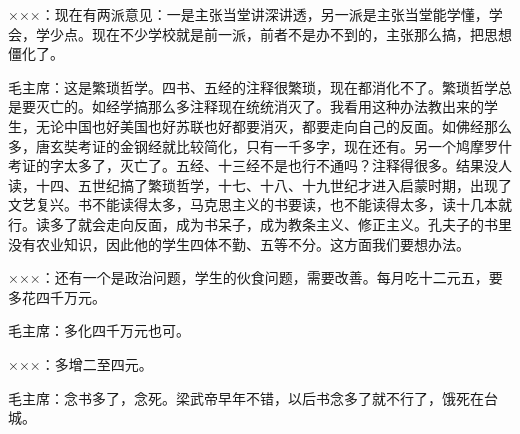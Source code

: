 ×××：现在有两派意见：一是主张当堂讲深讲透，另一派是主张当堂能学懂，学会，学少点。现在不少学校就是前一派，前者不是办不到的，主张那么搞，把思想僵化了。

毛主席：这是繁琐哲学。四书、五经的注释很繁琐，现在都消化不了。繁琐哲学总是要灭亡的。如经学搞那么多注释现在统统消灭了。我看用这种办法教出来的学生，无论中国也好美国也好苏联也好都要消灭，都要走向自己的反面。如佛经那么多，唐玄奘考证的金钢经就比较简化，只有一千多字，现在还有。另一个鸠摩罗什考证的字太多了，灭亡了。五经、十三经不是也行不通吗？注释得很多。结果没人读，十四、五世纪搞了繁琐哲学，十七、十八、十九世纪才进入启蒙时期，出现了文艺复兴。书不能读得太多，马克思主义的书要读，也不能读得太多，读十几本就行。读多了就会走向反面，成为书呆子，成为教条主义、修正主义。孔夫子的书里没有农业知识，因此他的学生四体不勤、五等不分。这方面我们要想办法。

×××：还有一个是政治问题，学生的伙食问题，需要改善。每月吃十二元五，要多花四千万元。

毛主席：多化四千万元也可。

×××：多增二至四元。

毛主席：念书多了，念死。梁武帝早年不错，以后书念多了就不行了，饿死在台城。


